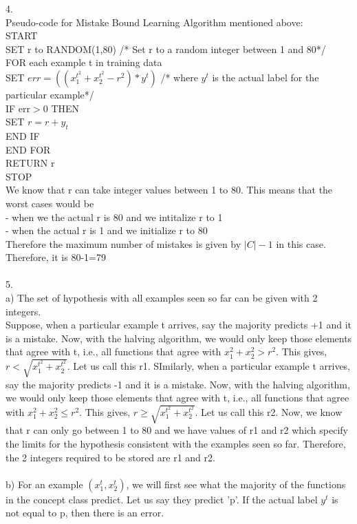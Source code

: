 \documentclass[12pt, fullpage,letterpaper]{article}
\begin{document}
4.\\
Pseudo-code for Mistake Bound Learning Algorithm mentioned above:\\
START\\
SET r to RANDOM(1,80) /* Set r to a random integer between 1 and 80*/\\
FOR each example t in training data\\
SET $err=((x_1^{t^2} + x_2^{t^2} - r^2)*y^t)$     /*  where $y^t$ is the actual label for the particular example*/\\
IF err$>0$ THEN\\
SET $r=r+y_t$\\
END IF\\
END FOR\\
RETURN r\\
STOP\\
We know that r can take integer values between 1 to 80. This means that the worst cases would be\\
- when we the actual r is 80 and we intitalize r to 1\\
- when the actual r is 1 and we initialize r to 80\\
Therefore the maximum number of mistakes is given by $|C|-1$ in this case. Therefore, it is 80-1=79\\\\
5.\\
a) The set of hypothesis  with all examples seen so far can be given with 2 integers.\\
Suppose, when a particular example t arrives, say the majority predicts +1 and it is a mistake. Now, with the halving algorithm, we would only keep those elements that agree with t, i.e., all functions that agree with $ x_1^2 + x_2^2 > r^2$. This gives,  $r<\sqrt{x_1^{t^2} + x_2^{t^2}}$. Let us call this r1. SImilarly, when a particular example t arrives, say the majority predicts -1 and it is a mistake. Now, with the halving algorithm, we would only keep those elements that agree with t, i.e., all functions that agree with $ x_1^2 + x_2^2 \leq r^2$. This gives,  $r\geq \sqrt{x_1^{t^2} + x_2^{t^2}}$. Let us call this r2. Now, we know that r can only go between 1 to 80 and we have values of r1 and r2 which specify the limits for the hypothesis consistent with the examples seen so far. Therefore, the 2 integers required to be stored are r1 and r2.\\\\
b) For an example $(x_1^t, x_2^t)$, we will first see what the majority of the functions in the concept class predict. Let us say they predict 'p'. If the actual label $y^t$ is not equal to p, then there is an error.\\\\
\end{document}
